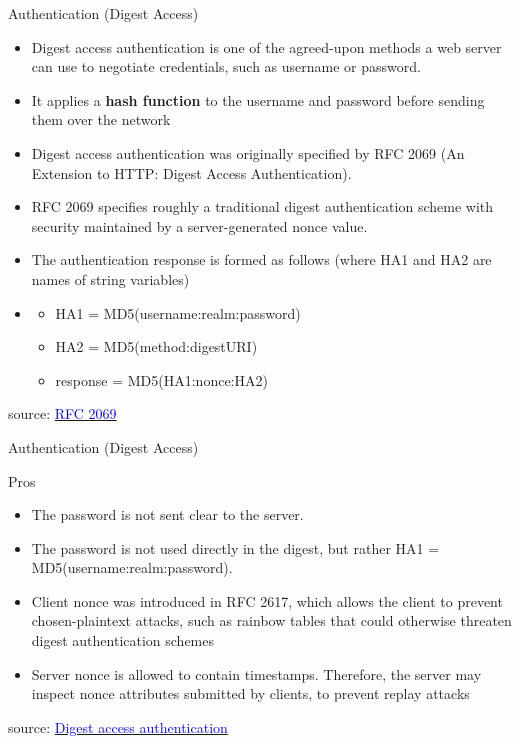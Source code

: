 \documentclass{beamer}
\begin{document}
\begin{frame}[t]{Authentication (Digest Access)}
  \begin{itemize}
    \scriptsize
    \item<1-> Digest access authentication is one of the agreed-upon methods a web server can use to negotiate credentials, such as username or password.
    \item<2-> It applies a \textbf{hash function} to the username and password before sending them over the network
    \item<3-> Digest access authentication was originally specified by RFC 2069 (An Extension to HTTP: Digest Access Authentication).
    \item<4-> RFC 2069 specifies roughly a traditional digest authentication scheme with security maintained by a server-generated nonce value.
    \item<5-> The authentication response is formed as follows (where HA1 and HA2 are names of string variables)
    \item<6->[]
  		\begin{itemize}
			\item[] HA1 = MD5(username:realm:password) 
			\item[] HA2 = MD5(method:digestURI) 
			\item[] response = MD5(HA1:nonce:HA2) 
		\end{itemize}	
  \end{itemize}

\vspace{14mm}
\tiny source: \href{https://datatracker.ietf.org/doc/html/rfc2069} {\textcolor{blue}{RFC 2069}} 	
\end{frame}

\begin{frame}[t]{Authentication (Digest Access)}
    \scriptsize

	Pros
  \begin{itemize}
    \item<1-> The password is not sent clear to the server.
    \item<2-> The password is not used directly in the digest, but rather HA1 = MD5(username:realm:password).
    \item<3-> Client nonce was introduced in RFC 2617, which allows the client to prevent chosen-plaintext attacks, such as rainbow tables that could otherwise threaten digest authentication schemes
    \item<4-> Server nonce is allowed to contain timestamps. Therefore, the server may inspect nonce attributes submitted by clients, to prevent replay attacks
  \end{itemize}

\vspace{37mm}
\tiny source: \href{https://en.wikipedia.org/wiki/Digest_access_authentication} {\textcolor{blue}{Digest access authentication}} 	
\end{frame}
\end{document}
